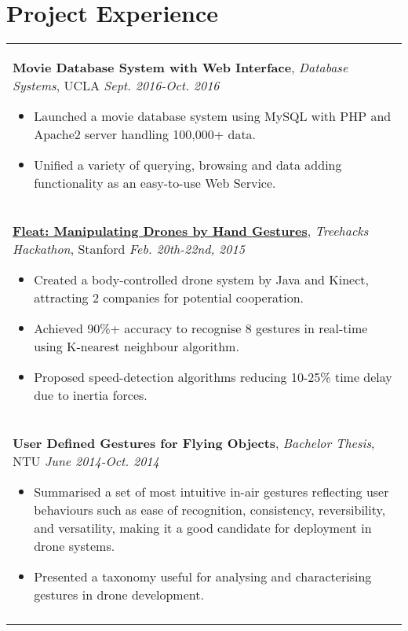 \documentclass[a4paper,10pt]{article} %
\begin{document}

\section{\textbf{Project Experience}}
\begin{tabular}{p{17cm}}


\normalsize\textbf{Movie Database System with Web Interface}, {\it{Database Systems}}, UCLA \hfill {\it Sept. 2016-Oct. 2016}
\begin{itemize}
\item Launched a movie database system using MySQL with PHP and Apache2 server handling 100,000+ data.
\item Unified a variety of querying, browsing and data adding functionality as an easy-to-use Web Service.\vspace*{-\baselineskip}
\end{itemize} \\
\vspace{0.5mm}

\normalsize\textbf{\href{https://www.youtube.com/watch?v=jxsZaQ6PcXU}{Fleat: Manipulating Drones by Hand Gestures}}, {\it{Treehacks Hackathon}}, Stanford \hfill {\it Feb. 20th-22nd, 2015}

\vspace{0.5mm}
\begin{itemize}
\item Created a body-controlled drone system by Java and Kinect, attracting 2 companies for potential cooperation. 
\item Achieved 90\%+ accuracy to recognise 8 gestures in real-time using K-nearest neighbour algorithm.
\item Proposed speed-detection algorithms reducing 10-25\% time delay due to inertia forces. \vspace*{-\baselineskip}
\end{itemize} \\
\vspace{0.5mm}

\normalsize\textbf{User Defined Gestures for Flying Objects}, {\it{Bachelor Thesis}}, NTU \hfill {\it June 2014-Oct. 2014}
\vspace{0.5mm}
\begin{itemize}
\item Summarised a set of most intuitive in-air gestures reflecting user behaviours such as ease of recognition, consistency, reversibility, and versatility, making it a good candidate for deployment in drone systems.
\item Presented a taxonomy useful for analysing and characterising gestures in drone development.\vspace*{-\baselineskip} 
\end{itemize} \\
\vspace{0.5mm}


\end{tabular}
\end{document}
